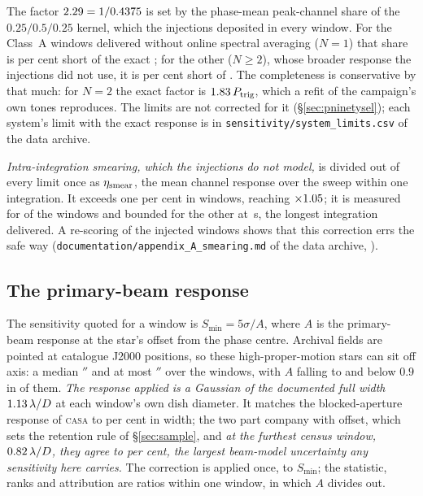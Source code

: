 The factor $2.29=1/0.4375$ is set by the phase-mean peak-channel
share of the $0.25/0.5/0.25$ kernel, which the injections deposited in every
window. For the \SvNWinNOne{} Class~A windows delivered without online
spectral averaging ($N=1$) that share is \InjShortPct{} per cent short of the
exact \InjRespMean; for the other \SvNWinNAvg{} ($N\geq2$), whose broader
response the injections did not use, it is \SvRespShortPctTwo{} per cent short
of \SvRespMeanTwo. The completeness is conservative by that much: for $N=2$ the exact factor is
$1.83\,P_{\rm trig}$, which a refit of the campaign's own tones
reproduces. The limits are not corrected for it (\S\ref{sec:pninetysel}); each
system's limit with the exact response is in
\texttt{sensitivity/\allowbreak system\_limits.csv} of the data archive.

\emph{Intra-integration smearing, which the injections do not model,} is
divided out of every limit once as $\eta_{\rm smear}$, the mean channel
response over the sweep within one integration. It exceeds one per cent in
\NmRespNApplied{} windows, reaching $\times1.05$; it is measured for
\SmcNMeas{} of the \NWindows{} windows and bounded for the other \SmcNBound{}
at \SmcDtCeil\,s, the longest integration delivered. A re-scoring of the
injected windows shows that this correction errs the safe way
(\texttt{documentation/\allowbreak appendix\_A\_smearing.md} of the data
archive, \citealt{SIdeposit}).

\subsection{The primary-beam response}
\label{app:pbresp}

The sensitivity quoted for a window is $S_{\min}=5\sigma/A$, where $A$ is the
primary-beam response at the star's offset from the phase centre. Archival
fields are pointed at catalogue J2000 positions, so these high-proper-motion
stars can sit off axis: a median \PbOffMed$''$ and at most \BmOffMax$''$ over
the \PbNWin{} windows, with $A$ falling to \BmRespMin{} and below $0.9$ in
\BmNBelowNine{} of them. \emph{The response applied is a Gaussian of the documented full
width} $1.13\,\lambda/D$ \citep{ALMAHandbook} at each window's own dish
diameter. It matches the blocked-aperture response of \textsc{casa}
\citep{CASA2022} to \BmDocAiryPct{} per cent in width; the two part company
with offset, which sets the retention rule of \S\ref{sec:sample}, and
\emph{at the furthest census window, $0.82\,\lambda/D$, they agree
to \BmCensusWorstPct{} per cent, the largest beam-model uncertainty any
sensitivity here carries.} The correction is applied once, to $S_{\min}$; the
statistic, ranks and attribution are ratios within one window, in which $A$
divides out.

